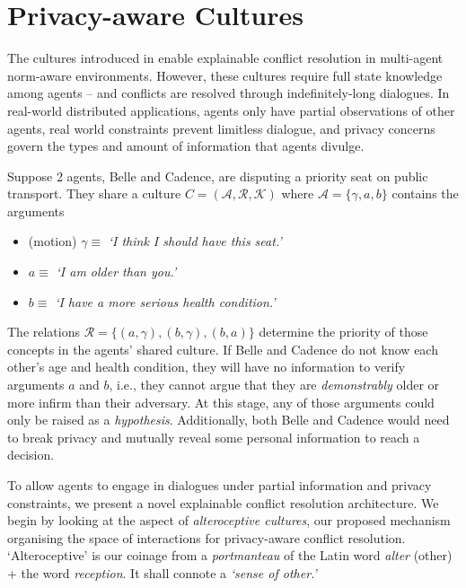 \documentclass[acmsmall]{custom-arxiv}  %
\begin{document}
\section{Privacy-aware Cultures}
\label{section:architecture}

The cultures introduced in \citet{Raymond2020Culture-BasedDeconfliction} enable explainable conflict resolution in multi-agent norm-aware environments. However, these cultures require full state knowledge among agents -- and conflicts are resolved through indefinitely-long dialogues. In real-world distributed applications, agents only have partial observations of other agents, real world constraints prevent limitless dialogue, and privacy concerns govern the types and amount of information that agents divulge.





\begin{example}
\label{example:belle-charlotte}
Suppose 2 agents, Belle and Cadence, are disputing a priority seat on public transport. They share a culture $C = (\mathcal{A}, \mathcal{R}, \mathcal{K})$ where $\mathcal{A} = \{\gamma, a, b\}$ contains the arguments 
\begin{itemize}
    \item (motion) $\gamma \equiv$ \textit{`I think I should have this seat.'}
    \item $a \equiv$ \textit{`I am older than you.'}
    \item $b \equiv$ \textit{`I have a more serious health condition.'}
\end{itemize}
The relations $\mathcal{R} = \{(a, \gamma), (b, \gamma), (b, a)\}$ determine the priority of those concepts in the agents' shared culture. If Belle and Cadence do not know each other's age and health condition, they will have no information to verify arguments $a$ and $b$, i.e., they cannot argue that they are \textit{demonstrably} older or more infirm than their adversary. At this stage, any of those arguments could only be raised as a \textit{hypothesis}. Additionally, both Belle and Cadence would need to break privacy and mutually reveal some personal information to reach a decision.
\end{example}

To allow agents to engage in dialogues under partial information and privacy constraints, we present a novel explainable conflict resolution architecture. We begin by looking at the aspect of \textit{alteroceptive cultures}, our proposed mechanism organising the space of interactions for privacy-aware conflict resolution. `Alteroceptive' is our coinage from a \textit{portmanteau} of the Latin word \textit{alter} (other) + the word \textit{reception}. It shall connote a \textit{`sense of other.'}
\end{document}
